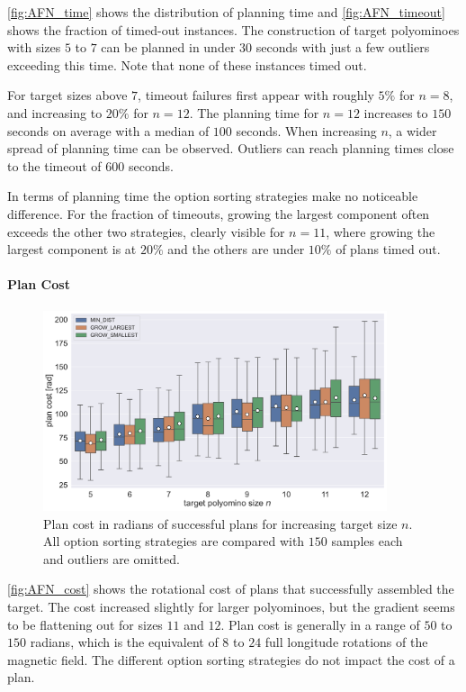 \autoref{fig:AFN_time} shows the distribution of planning time and \autoref{fig:AFN_timeout} shows the fraction of timed-out instances.
The construction of target polyominoes with sizes $5$ to $7$ can be planned in under $30$ seconds with just a few outliers exceeding this time.
Note that none of these instances timed out.

For target sizes above $7$, timeout failures first appear with roughly $5\%$ for $n = 8$, and increasing to $20\%$ for $n=12$.
The planning time for $n = 12$ increases to $150$ seconds on average with a median of $100$ seconds.
When increasing $n$, a wider spread of planning time can be observed.
Outliers can reach planning times close to the timeout of $600$ seconds.

In terms of planning time the option sorting strategies make no noticeable difference.
For the fraction of timeouts, growing the largest component often exceeds the other two strategies, clearly visible for $n=11$, where growing the largest component is at $20\%$ and the others are under $10\%$ of plans timed out.

\newpage

\paragraph{Plan Cost}

\begin{figure}
	\centering
	\includegraphics[width=0.9\textwidth]{figures/plots/AFN_cost.pdf}
	\caption[Plan cost for increasing target size]{Plan cost in radians of successful plans for increasing target size $n$. All option sorting strategies are compared with $150$ samples each and outliers are omitted.}
	\label{fig:AFN_cost}
\end{figure}

\autoref{fig:AFN_cost} shows the rotational cost of plans that successfully assembled the target.
The cost increased slightly for larger polyominoes, but the gradient seems to be flattening out for sizes $11$ and $12$.
Plan cost is generally in a range of $50$ to $150$ radians, which is the equivalent of $8$ to $24$ full longitude rotations of the magnetic field.
The different option sorting strategies do not impact the cost of a plan.

